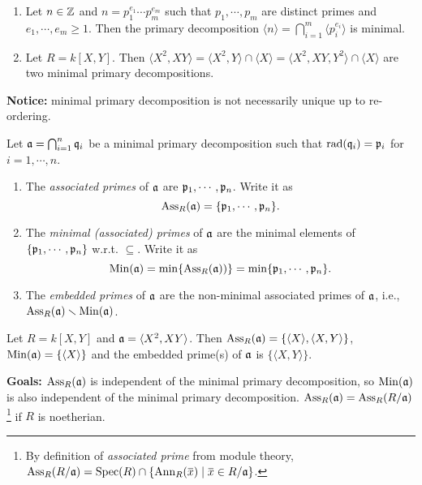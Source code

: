 \begin{example}\label{4.24}
    \begin{enumerate}
        \item 
            Let $n \in \mathbb{Z}$ and $n = p_1^{e_1} \cdots p_m^{e_m}$ such that $p_1,\cdots,p_m$ are distinct primes and $e_1,\cdots,e_m \geq 1$. Then the primary decomposition $\langle n \rangle = \bigcap_{i=1}^{m} \langle p_i^{e_i} \rangle$ is minimal.
        \item Let $R = k[X,Y]$. Then $\langle X^{2},XY \rangle = \langle X^{2},Y \rangle \cap \langle X \rangle = \langle X^{2},XY,Y^{2} \rangle \cap \langle X \rangle$ are two minimal primary decompositions.
    \end{enumerate}
\end{example}

\noindent \textbf{Notice:} minimal primary decomposition is not necessarily unique up to re-ordering.

\begin{definition}\label{4.25}
    Let $\mathfrak{a} = \bigcap_{i=1}^{n} \mathfrak{q}_i$ be a minimal primary decomposition such that $\operatorname{rad}(\mathfrak{q}_i) = \mathfrak{p}_i$ for $i = 1,\cdots,n$.
    \begin{enumerate}
        \item The \emph{associated primes} of $\mathfrak{a}$ are $\mathfrak{p}_1,\cdots,\mathfrak{p}_n$. Write it as 
            \[\operatorname{Ass}_R(\mathfrak{a}) = \{\mathfrak{p}_1,\cdots,\mathfrak{p}_n\}.\]
        \item The \emph{minimal (associated) primes} of $\mathfrak{a}$ are the minimal elements of $\{\mathfrak{p}_1,\cdots,\mathfrak{p}_n\}$ w.r.t. $\subseteq$. Write it as 
            \[\operatorname{Min}(\mathfrak{a}) = \min\{\operatorname{Ass}_R(\mathfrak{a}))\} = \min\{\mathfrak{p}_1,\cdots,\mathfrak{p}_n\}.\]
    \item The \emph{embedded primes} of $\mathfrak{a}$ are the non-minimal associated primes of $\mathfrak{a}$, i.e., $\operatorname{Ass}_R(\mathfrak{a}) \smallsetminus \operatorname{Min}(\mathfrak{a})$.
    \end{enumerate}
\end{definition}

\begin{example}\label{4.26}
    Let $R = k[X,Y]$ and $\mathfrak{a} = \langle X^{2},XY \rangle$. Then $\operatorname{Ass}_R(\mathfrak{a}) = \{\langle X \rangle, \langle X,Y \rangle\}$, $\operatorname{Min}(\mathfrak{a}) = \{\langle X \rangle\}$ and the embedded prime(s) of $\mathfrak{a}$ is $\{\langle X,Y \rangle\}$.
\end{example}

\noindent \textbf{Goals:} $\operatorname{Ass}_R(\mathfrak{a})$ is independent of the minimal primary decomposition, so $\operatorname{Min}(\mathfrak{a})$ is also independent of the minimal primary decomposition. $\operatorname{Ass}_R(\mathfrak{a}) = \operatorname{Ass}_R(R/\mathfrak{a})$\footnote[2]{By definition of \emph{associated prime} from module theory, $\operatorname{Ass}_R(R/\ffa) = \operatorname{Spec}(R) \cap \{\operatorname{Ann}_R(\overbar{x}) \mid \overbar x \in R/\ffa\}$.} if $R$ is noetherian.


